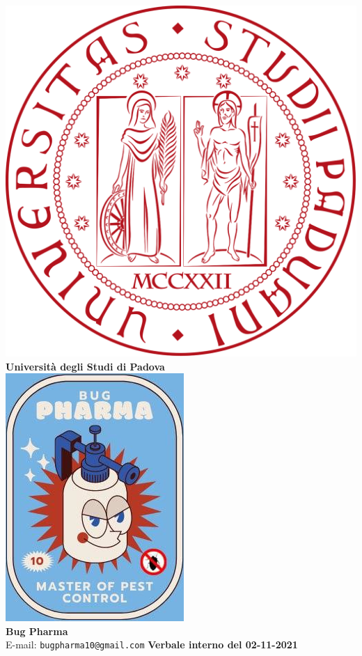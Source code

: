 \documentclass[11pt]{article}
\begin{document}
	\thispagestyle{empty}
	\begin{titlepage}
		\begin{center}
			\includegraphics[scale = 0.05]{../../logo_unipd.png}\\
			\large \textbf{Università degli Studi di Padova} \\
			\vfill
			\includegraphics[scale = 0.7]{../../logo_small.jpg}\\
			\large \textbf{Bug Pharma} \\
			\vfill
			\large
			E-mail: 
			\texttt{bugpharma10@gmail.com}
			\vfill
			\Huge \textbf{Verbale interno del 02-11-2021}\\
			

\end{center}
\end{titlepage}
\end{document}
